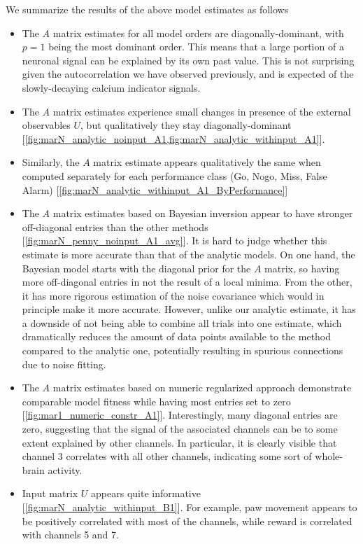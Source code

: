 \documentclass[a4paper,10pt]{article}
\begin{document}
We summarize the results of the above model estimates as follows
\begin{itemize}
 \item The $A$ matrix estimates for all model orders are diagonally-dominant, with $p=1$ being the most dominant order. This means that a large portion of a neuronal signal can be explained by its own past value. This is not surprising given the autocorrelation we have observed previously, and is expected of the slowly-decaying calcium indicator signals.
 \item The $A$ matrix estimates experience small changes in presence of the external observables $U$, but qualitatively they stay diagonally-dominant [\cref{fig:marN_analytic_noinput_A1,fig:marN_analytic_withinput_A1}].
 \item Similarly, the $A$ matrix estimate appears qualitatively the same when computed separately for each performance class (Go, Nogo, Miss, False Alarm) [\cref{fig:marN_analytic_withinput_A1_ByPerformance}]
 \item The $A$ matrix estimates based on Bayesian inversion appear to have stronger off-diagonal entries than the other methods [\cref{fig:marN_penny_noinput_A1_avg}]. It is hard to judge whether this estimate is more accurate than that of the analytic models. On one hand, the Bayesian model starts with the diagonal prior for the $A$ matrix, so having more off-diagonal entries in not the result of a local minima. From the other, it has more rigorous estimation of the noise covariance which would in principle make it more accurate. However, unlike our analytic estimate, it has a downside of not being able to combine all trials into one estimate, which dramatically reduces the amount of data points available to the method compared to the analytic one, potentially resulting in spurious connections due to noise fitting.
 \item The $A$ matrix estimates based on numeric regularized approach demonstrate comparable model fitness while having most entries set to zero [\cref{fig:mar1_numeric_constr_A1}]. Interestingly, many diagonal entries are zero, suggesting that the signal of the associated channels can be to some extent explained by other channels. In particular, it is clearly visible that channel 3 correlates with all other channels, indicating some sort of whole-brain activity.
 \item Input matrix $U$ appears quite informative [\cref{fig:marN_analytic_withinput_B1}]. For example, paw movement appears to be positively correlated with most of the channels, while reward is correlated with channels 5 and 7.

\end{itemize}
\end{document}
